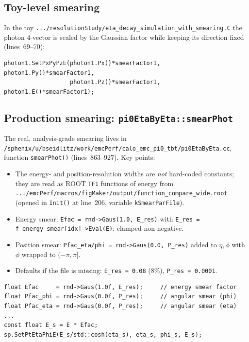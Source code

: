 \documentclass[11pt]{article}
\newcommand{\pp}[1]{\textcolor{pathcol}{\texttt{#1}}}
\begin{document}
\subsection{Toy-level smearing}
In the toy
\pp{.../resolutionStudy/eta\_decay\_simulation\_with\_smearing.C} the photon
4-vector is scaled by the Gaussian factor while keeping its direction fixed
(lines~69--70):
\begin{lstlisting}
photon1.SetPxPyPzE(photon1.Px()*smearFactor1, photon1.Py()*smearFactor1,
                   photon1.Pz()*smearFactor1, photon1.E()*smearFactor1);
\end{lstlisting}

\subsection{Production smearing: \texttt{pi0EtaByEta::smearPhot}}
The real, analysis-grade smearing lives in\\
\pp{/sphenix/u/bseidlitz/work/emcPerf/calo\_emc\_pi0\_tbt/pi0EtaByEta.cc},
function \texttt{smearPhot()} (lines~863--927). Key points:
\begin{itemize}[nosep]
  \item The energy- and position-resolution widths are \emph{not} hard-coded
        constants; they are read as ROOT \texttt{TF1} functions of energy from\\
        \pp{.../emcPerf/macros/figMaker/output/function\_compare\_wide.root}
        (opened in \texttt{Init()} at line~206, variable \texttt{kSmearParFile}).
  \item Energy smear: \texttt{Efac = rnd->Gaus(1.0, E\_res)} with
        \texttt{E\_res = f\_energy\_smear[idx]->Eval(E)}; clamped non-negative.
  \item Position smear: \texttt{Pfac\_eta/phi = rnd->Gaus(0.0, P\_res)} added to
        $\eta,\phi$ with $\phi$ wrapped to $(-\pi,\pi]$.
  \item Defaults if the file is missing: \texttt{E\_res = 0.08} (8\%),
        \texttt{P\_res = 0.0001}.
\end{itemize}

\begin{lstlisting}
float Efac     = rnd->Gaus(1.0f, E_res);     // energy smear factor
float Pfac_phi = rnd->Gaus(0.0f, P_res);     // angular smear (phi)
float Pfac_eta = rnd->Gaus(0.0f, P_res);     // angular smear (eta)
...
const float E_s = E * Efac;
sp.SetPtEtaPhiE(E_s/std::cosh(eta_s), eta_s, phi_s, E_s);
\end{lstlisting}
\end{document}
